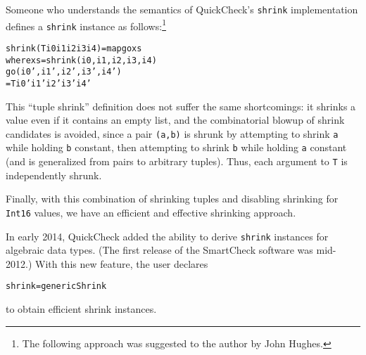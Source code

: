 \documentclass{sigplanconf}
\newenvironment{code}{\begin{alltt}\footnotesize}{\end{alltt}}
\newcommand{\ttp}[1]{\texttt{#1}}
\begin{document}
Someone who understands the semantics of QuickCheck's \ttp{shrink}
implementation defines a \ttp{shrink} instance as follows:\footnote{The
  following approach was suggested to the author by John Hughes.}
%
\begin{code}
shrink (T i0 i1 i2 i3 i4) = map go xs
  where xs = shrink (i0, i1, i2, i3, i4)
        go (i0', i1', i2', i3', i4')
           = T i0' i1' i2' i3' i4'
\end{code}
%
\noindent
This ``tuple shrink'' definition does not suffer the same shortcomings: it
shrinks a value even if it contains an empty list, and the combinatorial blowup
of shrink candidates is avoided, since a pair \ttp{(a,b)} is shrunk by
attempting to shrink \ttp{a} while holding \ttp{b} constant, then attempting to
shrink \ttp{b} while holding \ttp{a} constant (and is generalized from pairs to
arbitrary tuples).  Thus, each argument to \ttp{T} is independently shrunk.

Finally, with this combination of shrinking tuples and disabling shrinking for
\ttp{Int16} values, we have an efficient and effective shrinking approach.

In early 2014, QuickCheck added the ability to derive \ttp{shrink} instances for
algebraic data types.  (The first release of the SmartCheck software was
mid-2012.)  With this new feature, the user declares
%
\begin{code}
shrink = genericShrink
\end{code}
%
\noindent
to obtain efficient shrink instances.




\end{document}
